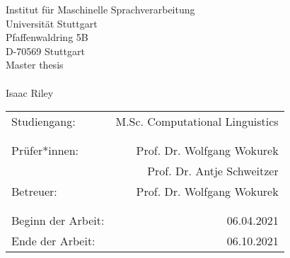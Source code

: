 \begin{titlepage}
    \large
     \begin{center}
      Institut für Maschinelle Sprachverarbeitung\\
      Universität Stuttgart\\
      Pfaffenwaldring 5B\\
      D-70569 Stuttgart\\    
      
      \vspace{2.5cm}
      Master thesis\\
      {\LARGE \bf \Titel} \\
      \vspace{2cm}
      Isaac Riley\\
         \vfill
      \begin{tabular}[t]{lr}
      Studiengang: & M.Sc. Computational Linguistics \\ %
      \\
      \\
      {Prüfer*innen:} & Prof. Dr. Wolfgang Wokurek\\
       & Prof. Dr. Antje Schweitzer\\
      {Betreuer:} & Prof. Dr. Wolfgang Wokurek\\ 
      \\
      \\
      {Beginn der Arbeit:} & 06.04.2021\\
      {Ende der Arbeit:} & 06.10.2021\\
      \end{tabular}
    \end{center}
  \setlength{\hoffset}{0cm}
    \normalsize
  \end{titlepage}
  
